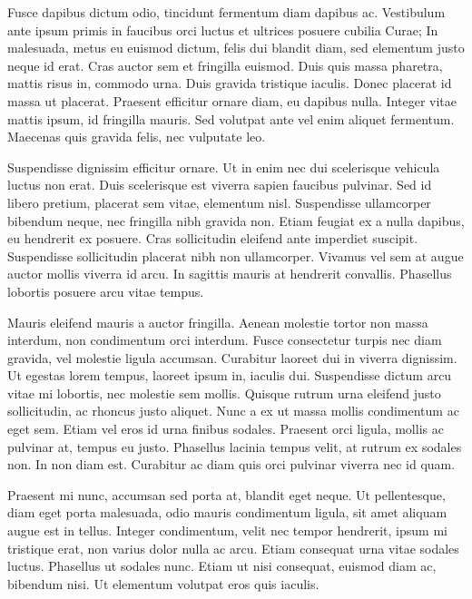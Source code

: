 \documentclass[a4paper]{article}
\begin{document}
Fusce dapibus dictum odio, tincidunt fermentum diam dapibus ac. Vestibulum ante ipsum primis in faucibus orci luctus et ultrices posuere cubilia Curae; In malesuada, metus eu euismod dictum, felis dui blandit diam, sed elementum justo neque id erat. Cras auctor sem et fringilla euismod. Duis quis massa pharetra, mattis risus in, commodo urna. Duis gravida tristique iaculis. Donec placerat id massa ut placerat. Praesent efficitur ornare diam, eu dapibus nulla. Integer vitae mattis ipsum, id fringilla mauris. Sed volutpat ante vel enim aliquet fermentum. Maecenas quis gravida felis, nec vulputate leo.

Suspendisse dignissim efficitur ornare. Ut in enim nec dui scelerisque vehicula luctus non erat. Duis scelerisque est viverra sapien faucibus pulvinar. Sed id libero pretium, placerat sem vitae, elementum nisl. Suspendisse ullamcorper bibendum neque, nec fringilla nibh gravida non. Etiam feugiat ex a nulla dapibus, eu hendrerit ex posuere. Cras sollicitudin eleifend ante imperdiet suscipit. Suspendisse sollicitudin placerat nibh non ullamcorper. Vivamus vel sem at augue auctor mollis viverra id arcu. In sagittis mauris at hendrerit convallis. Phasellus lobortis posuere arcu vitae tempus.

Mauris eleifend mauris a auctor fringilla. Aenean molestie tortor non massa interdum, non condimentum orci interdum. Fusce consectetur turpis nec diam gravida, vel molestie ligula accumsan. Curabitur laoreet dui in viverra dignissim. Ut egestas lorem tempus, laoreet ipsum in, iaculis dui. Suspendisse dictum arcu vitae mi lobortis, nec molestie sem mollis. Quisque rutrum urna eleifend justo sollicitudin, ac rhoncus justo aliquet. Nunc a ex ut massa mollis condimentum ac eget sem. Etiam vel eros id urna finibus sodales. Praesent orci ligula, mollis ac pulvinar at, tempus eu justo. Phasellus lacinia tempus velit, at rutrum ex sodales non. In non diam est. Curabitur ac diam quis orci pulvinar viverra nec id quam.

Praesent mi nunc, accumsan sed porta at, blandit eget neque. Ut pellentesque, diam eget porta malesuada, odio mauris condimentum ligula, sit amet aliquam augue est in tellus. Integer condimentum, velit nec tempor hendrerit, ipsum mi tristique erat, non varius dolor nulla ac arcu. Etiam consequat urna vitae sodales luctus. Phasellus ut sodales nunc. Etiam ut nisi consequat, euismod diam ac, bibendum nisi. Ut elementum volutpat eros quis iaculis.
    
\end{document}
